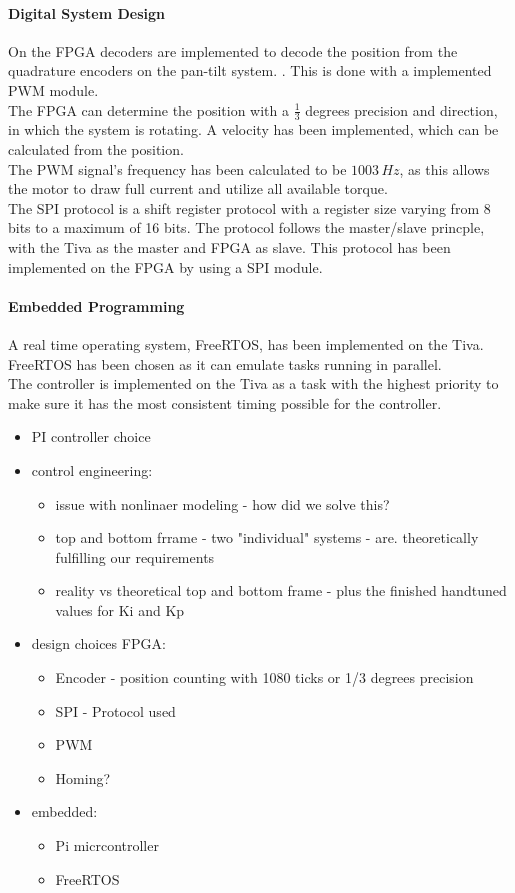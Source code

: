\documentclass[../../main]{subfiles}
\begin{document}
\paragraph{Digital System Design}
On the FPGA decoders are implemented to decode the position from the quadrature encoders on the pan-tilt system.
. This is done with a implemented PWM module.\\
The FPGA can determine the position with a $\frac{1}{3}$ degrees precision and direction, in which the system is rotating. A velocity has been implemented, which can be calculated from the position.\\
The PWM signal's frequency has been calculated to be $1003 \si{\,Hz}$, as this allows the motor to draw full current and utilize all available torque. \\
The SPI protocol is a shift register protocol with a register size varying from 8 bits to a maximum of 16 bits. The protocol follows the master/slave princple, with the Tiva as the master and FPGA as slave. This protocol has been implemented on the FPGA by using a SPI module.

\paragraph{Embedded Programming}
A real time operating system, FreeRTOS, has been implemented on the Tiva. FreeRTOS has been chosen as it can emulate tasks running in parallel. \\
The controller is implemented on the Tiva as a task with the highest priority to make sure it has the most consistent timing possible for the controller.

\begin{itemize}
  \item PI controller choice
  \item control engineering:
  \begin{itemize}
    \item issue with nonlinaer modeling - how did we solve this?
    \item top and bottom frrame - two "individual" systems - are. theoretically fulfilling our requirements
    \item reality vs theoretical top and bottom frame - plus the finished handtuned values for Ki and Kp
  \end{itemize}
  \item design choices FPGA:
    \begin{itemize}
      \item Encoder - position counting with 1080 ticks or 1/3 degrees precision
      \item SPI - Protocol used
      \item PWM
      \item Homing?
    \end{itemize}
  \item embedded:
  \begin{itemize}
    \item Pi micrcontroller
    \item FreeRTOS
  \end{itemize}


\end{itemize}
\end{document}
